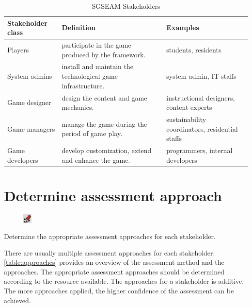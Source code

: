 \documentclass[11pt,oneside]{book}
\newcommand\tabhead[1]{\small\textbf{#1}}
\begin{document}
\begin{table}[ht!]
  \centering
  \begin{tabular}{|p{}|p{}|p{}|}
    \hline
    \tabhead{Stakeholder class} &
    \tabhead{Definition} &
    \tabhead{Examples} \\
    \hline
    Players &
    participate in the game produced by the framework. &
    students, residents \\
    \hline
    System admins &
    install and maintain the technological game infrastructure. &
    system admin, IT staffs \\
    \hline
    Game designer &
    design the content and game mechanics. &
    instructional designers, content experts \\
    \hline
    Game managers &
    manage the game during the period of game play.&
    sustainability coordinators, residential staffs\\
    \hline
    Game developers &
    develop customization, extend and enhance the game. &
    programmers, internal developers \\
    \hline
  \end{tabular}
  \caption{SGSEAM Stakeholders}
  \label{table:stakeholders}
\end{table}

\section{Determine assessment approach}

\begin{shadebox}
\begin{figure}
\vspace{-15pt}\hspace{-10pt}
    \includegraphics[width=0.04\textwidth]{note-icon}
\end{figure}
Determine the appropriate assessment approaches for each stakeholder.
\end{shadebox}

There are usually multiple assessment approaches for each stakeholder.  \autoref{table:approaches} provides 
an overview of the assessment method and the approaches. The appropriate assessment approaches should 
be determined according to the resource available. The approaches for a stakeholder is additive. The more 
approaches applied, the higher confidence of the assessment can be achieved. 
\end{document}
